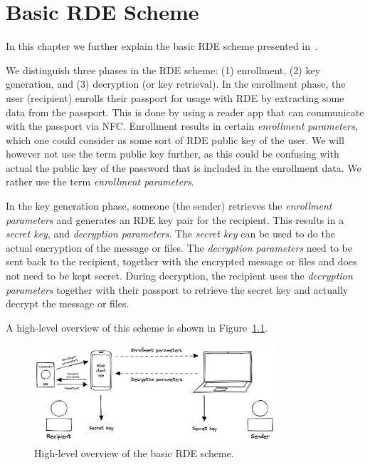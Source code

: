 \chapter{Basic RDE Scheme}
\label{ch:basic-rde-scheme}

In this chapter we further explain the basic RDE scheme presented in~\cite{verheul2017remote}.

We distinguish three phases in the RDE scheme: (1) enrollment, (2) key generation, and (3) decryption (or key retrieval).
In the enrollment phase, the user (recipient) enrolls their passport for usage with RDE by extracting some data from the passport.
This is done by using a reader app that can communicate with the passport via NFC.
Enrollment results in certain \textit{enrollment parameters}, which one could consider as some sort of RDE public key of the user.
We will however not use the term public key further, as this could be confusing with actual the public key of the password that is included in the enrollment data.
We rather use the term \textit{enrollment parameters}.

In the key generation phase, someone (the sender) retrieves the \textit{enrollment parameters} and generates an RDE key pair for the recipient.
This results in a \textit{secret key}, and \textit{decryption parameters}.
The \textit{secret key} can be used to do the actual encryption of the message or files.
The \textit{decryption parameters} need to be sent back to the recipient, together with the encrypted message or files and does not need to be kept secret.
During decryption, the recipient uses the \textit{decryption parameters} together with their passport to retrieve the secret key and actually decrypt the message or files.

A high-level overview of this scheme is shown in Figure~\ref{fig:basic-rde-scheme}.
\begin{figure}
\centering
\includegraphics[width=0.8\textwidth]{imgs/RDE overview}
\caption{High-level overview of the basic RDE scheme.}
\label{fig:basic-rde-scheme}
\end{figure}

